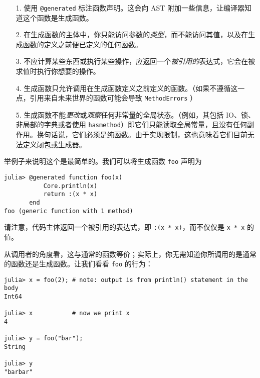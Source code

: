 \begin{itemize}
\item[1. ] 使用 \texttt{@generated} 标注函数声明。这会向 AST 附加一些信息，让编译器知道这个函数是生成函数。


\item[2. ] 在生成函数的主体中，你只能访问参数的\emph{类型}，而不能访问其值，以及在生成函数的定义之前便已定义的任何函数。


\item[3. ] 不应计算某些东西或执行某些操作，应返回一个\emph{被引用的}表达式，它会在被求值时执行你想要的操作。


\item[4. ] 生成函数只允许调用在生成函数定义之前定义的函数。（如果不遵循这一点，引用来自未来世界的函数可能会导致 \texttt{MethodErrors} ）


\item[5. ] 生成函数不能\emph{更改}或\emph{观察}任何非常量的全局状态。（例如，其包括 IO、锁、非局部的字典或者使用 \texttt{hasmethod}）即它们只能读取全局常量，且没有任何副作用。换句话说，它们必须是纯函数。由于实现限制，这也意味着它们目前无法定义闭包或生成器。

\end{itemize}


举例子来说明这个是最简单的。我们可以将生成函数 \texttt{foo} 声明为




\begin{verbatim}
julia> @generated function foo(x)
           Core.println(x)
           return :(x * x)
       end
foo (generic function with 1 method)
\end{verbatim}



请注意，代码主体返回一个被引用的表达式，即 \texttt{:(x * x)}，而不仅仅是 \texttt{x * x} 的值。



从调用者的角度看，这与通常的函数等价；实际上，你无需知道你所调用的是通常的函数还是生成函数。让我们看看 \texttt{foo} 的行为：




\begin{verbatim}
julia> x = foo(2); # note: output is from println() statement in the body
Int64

julia> x           # now we print x
4

julia> y = foo("bar");
String

julia> y
"barbar"
\end{verbatim}



